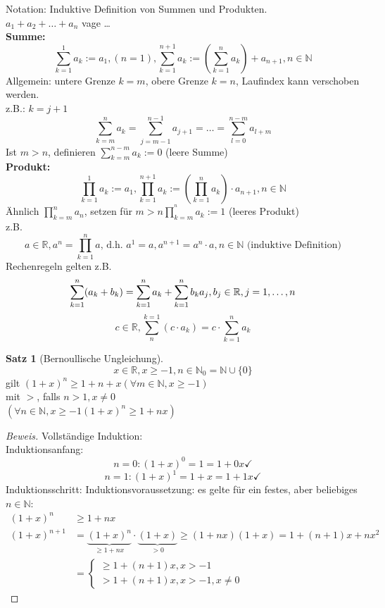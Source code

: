 \documentclass[12pt,a4paper,titlepage]{article} %
\theoremstyle{definition}
\newtheorem{satz}{Satz}[subsection]
\theoremstyle{remark}
\newenvironment{bew}{\begin{proof}[Beweis]}{\end{proof}}
\begin{document}
Notation: Induktive Definition von Summen und Produkten.\\
$a_1+a_2+\ldots + a_n$ vage \dots\\
\textbf{Summe:} \[\sum_{k=1}^{1} a_k := a_1, (n = 1), \sum_{k=1}^{n+1} a_k := \left( \sum_{k=1}^{n} a_k\right) + a_{n+1}, n\in\mathbb{N}\]
Allgemein: untere Grenze $k=m$, obere Grenze $k=n$, Laufindex kann verschoben werden.\\
z.B.: $k= j+1$
\[\sum_{k=m}^{n}a_k = \sum_{j=m-1}^{n-1}a_{j+1} = \ldots = \sum_{l = 0}^{n-m}a_{l+m}\]
Ist $m>n$, definieren $\sum_{k=m}^{n-m}a_k := 0$ (leere Summe)\\
\textbf{Produkt:} $$\prod_{k=1}^{1}a_k := a_1, \prod_{k=1}^{n+1}a_k := \left( \prod_{k=1}^{n}a_k\right) \cdot a_{n+1}, n\in\mathbb{N}$$
Ähnlich $\prod_{k=m}^{n}a_n$, setzen für $m>n \prod_{k=m}^^n a_k := 1$ (leeres Produkt)\\
z.B. $$a\in\mathbb{R}, a^n = \prod_{k=1}^n a \text{, d.h. } a^1=a, a^{n+1} = a^n \cdot a, n\in\mathbb{N} \text{ (induktive Definition)}$$
Rechenregeln gelten z.B. $$\sum_{k=1}^{n} (a_k+b_k) = \sum_{k=1}^{n} a_k + \sum_{k=1}^{n} b_k\\
a_j, b_j \in\mathbb{R}, j=1,\ldots, n$$
$$c \in\mathbb{R}, \sum_{n}^{k=1} (c\cdot a_k) = c\cdot \sum_{k=1}^{n} a_k$$
\begin{satz}[Bernoullische Ungleichung]
	$$x\in\mathbb{R}, x\geq -1, n\in\mathbb{N}_0 = \mathbb{N}\cup \{0\}$$
	gilt $(1+x)^n \geq 1+ n + x (\forall m\in\mathbb{N},x\geq -1)$\\mit \glqq $>$\grqq, falls $n>1, x\neq 0$\\
	$( \forall n\in\mathbb{N}, x \geq -1(1+x)^n \geq 1 + nx)$
\end{satz}
\begin{bew}
	Vollständige Induktion:\\
	Induktionsanfang:
	$$n=0: (1+x)^0=1=1+0x \checkmark$$
	$$n=1: (1+x)^1=1+x=1+1x \checkmark$$
	Induktionsschritt:
	Induktionsvoraussetzung: es gelte für ein festes, aber beliebiges $n\in\mathbb{N}$: 
	\begin{equation*}
	\begin{aligned}
		(1+x)^n &\geq 1+nx\\%
		(1+x)^{n+1} &= \underbrace{(1+x)^{n}}_{\geq 1+nx} \cdot \underbrace{(1+x)}_{> 0} \geq (1+nx)(1+x) = 1+(n+1)x + nx^2\\
		&=\begin{cases}
		\geq 1+(n+1)x, x>-1\\
		> 1+(n+1)x, x>-1, x\neq 0
		\end{cases}
	\end{aligned}
	\end{equation*}
\end{bew}
\end{document}
